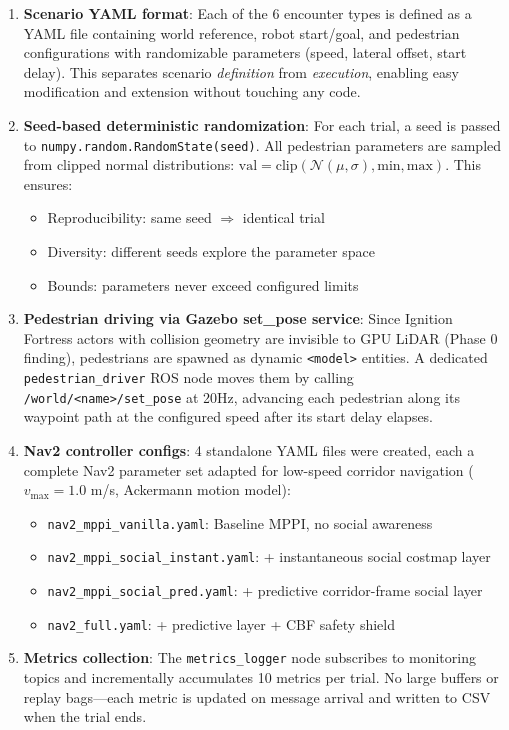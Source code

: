 \documentclass[11pt]{article}
\begin{document}
\begin{enumerate}
  \item \textbf{Scenario YAML format}: Each of the 6 encounter types is
    defined as a YAML file containing world reference, robot start/goal,
    and pedestrian configurations with randomizable parameters
    (speed, lateral offset, start delay). This separates scenario
    \emph{definition} from \emph{execution}, enabling easy modification
    and extension without touching any code.

  \item \textbf{Seed-based deterministic randomization}: For each trial,
    a seed is passed to \texttt{numpy.random.RandomState(seed)}.
    All pedestrian parameters are sampled from clipped normal distributions:
    $\text{val} = \text{clip}(\mathcal{N}(\mu, \sigma), \text{min}, \text{max})$.
    This ensures:
    \begin{itemize}
      \item Reproducibility: same seed $\Rightarrow$ identical trial
      \item Diversity: different seeds explore the parameter space
      \item Bounds: parameters never exceed configured limits
    \end{itemize}

  \item \textbf{Pedestrian driving via Gazebo set\_pose service}: Since
    Ignition Fortress actors with collision geometry are invisible to
    GPU LiDAR (Phase 0 finding), pedestrians are spawned as dynamic
    \texttt{<model>} entities. A dedicated \texttt{pedestrian\_driver}
    ROS node moves them by calling \texttt{/world/<name>/set\_pose} at
    20Hz, advancing each pedestrian along its waypoint path at the
    configured speed after its start delay elapses.

  \item \textbf{Nav2 controller configs}: 4 standalone YAML files were
    created, each a complete Nav2 parameter set adapted for low-speed
    corridor navigation ($v_{\max}=1.0$ m/s, Ackermann motion model):
    \begin{itemize}
      \item \texttt{nav2\_mppi\_vanilla.yaml}: Baseline MPPI, no social awareness
      \item \texttt{nav2\_mppi\_social\_instant.yaml}: + instantaneous social costmap layer
      \item \texttt{nav2\_mppi\_social\_pred.yaml}: + predictive corridor-frame social layer
      \item \texttt{nav2\_full.yaml}: + predictive layer + CBF safety shield
    \end{itemize}

  \item \textbf{Metrics collection}: The \texttt{metrics\_logger} node
    subscribes to monitoring topics and incrementally accumulates 10 metrics
    per trial. No large buffers or replay bags---each metric is updated
    on message arrival and written to CSV when the trial ends.
\end{enumerate}
\end{document}
